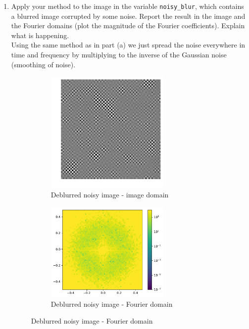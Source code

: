 \documentclass[12pt,twoside]{article}
\begin{document}
\begin{enumerate}
\begin{enumerate}
	
 \item Apply your method to the image in the variable \texttt{noisy\_blur}, which contains a blurred image corrupted by some noise.  Report the result in the image and the Fourier domains (plot the magnitude of the Fourier coefficients). Explain what is happening.\\
 Using the same method as in part (a) we just spread the noise everywhere in time and frequency by multiplying to the inverse of the Gaussian noise (smoothing of noise).
 
  \begin{figure}[H] 
\captionsetup[subfigure]{labelformat=empty}
\centering
   \begin{subfigure}[]{.5\textwidth}
   \centering
        \includegraphics[width=60mm]{code/wienerimages/DeNoisyBlurImage.pdf}
	\caption{Deblurred noisy image - image domain}
    \end{subfigure}%
   \begin{subfigure}[]{.5\textwidth}
   \centering   
        \includegraphics[width=60mm]{code/wienerimages/DeNoisyBlurImageFFT.pdf}
        \caption{Deblurred noisy image - Fourier domain}
    \end{subfigure}%
\end{figure}



\end{enumerate}
\end{enumerate}
\end{document}
